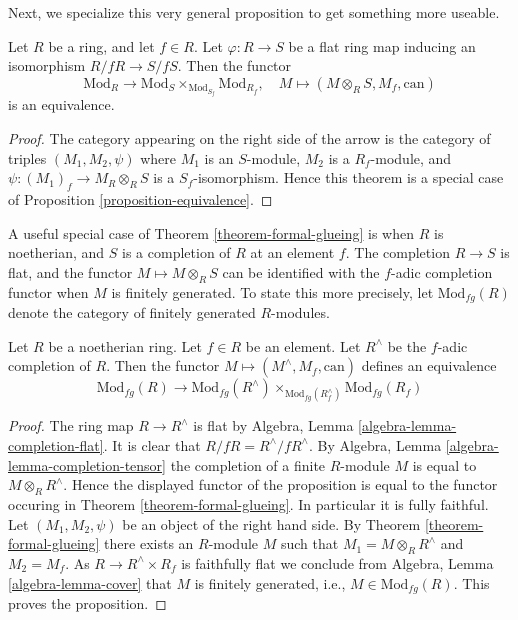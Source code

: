 \noindent
Next, we specialize this very general proposition to get something
more useable.

\begin{theorem}
\label{theorem-formal-glueing}
Let $R$ be a ring, and let $f \in R$.
Let $\varphi : R \to S$ be a flat ring map inducing an isomorphism
$R/fR \to S/fS$. Then the functor
$$
\text{Mod}_R
\longrightarrow
\text{Mod}_S \times_{\text{Mod}_{S_f}} \text{Mod}_{R_f},
\quad
M
\longmapsto
(M \otimes_R S, M_f, \text{can})
$$
is an equivalence.
\end{theorem}

\begin{proof}
The category appearing on the right side of the arrow
is the category of triples $(M_1, M_2, \psi)$ where $M_1$ is an
$S$-module, $M_2$ is a $R_f$-module, and
$\psi : (M_1)_f \to M_R \otimes_R S$ is a $S_f$-isomorphism.
Hence this theorem is a special case of
Proposition \ref{proposition-equivalence}.
\end{proof}

\noindent
A useful special case of
Theorem \ref{theorem-formal-glueing}
is when $R$ is noetherian, and $S$ is a completion of $R$ at an
element $f$. The completion $R \to S$ is flat, and the functor
$M \mapsto M \otimes_R S$ can be identified with the $f$-adic
completion functor when $M$ is finitely generated. To state
this more precisely, let $\text{Mod}_{fg}(R)$ denote the category
of finitely generated $R$-modules.

\begin{proposition}
\label{proposition-formal-glueing}
Let $R$ be a noetherian ring.
Let $f \in R$ be an element.
Let $R^\wedge$ be the $f$-adic completion of $R$.
Then the functor $M \mapsto (M^\wedge, M_f, \text{can})$
defines an equivalence
$$
\text{Mod}_{fg}(R)
\longrightarrow
\text{Mod}_{fg}(R^\wedge)
\times_{\text{Mod}_{fg}(R^\wedge_f)} 
\text{Mod}_{fg}(R_f)
$$
\end{proposition}

\begin{proof}
The ring map $R \to R^\wedge$ is flat by
Algebra, Lemma \ref{algebra-lemma-completion-flat}.
It is clear that $R/fR = R^\wedge/fR^\wedge$.
By
Algebra, Lemma \ref{algebra-lemma-completion-tensor}
the completion of a finite $R$-module $M$ is equal to $M \otimes_R R^\wedge$.
Hence the displayed functor of the proposition is equal to the
functor occuring in
Theorem \ref{theorem-formal-glueing}.
In particular it is fully faithful. Let $(M_1, M_2, \psi)$ be an
object of the right hand side. By
Theorem \ref{theorem-formal-glueing}
there exists an $R$-module $M$ such that
$M_1 = M \otimes_R R^\wedge$ and $M_2 = M_f$. As $R \to R^\wedge \times R_f$
is faithfully flat we conclude from
Algebra, Lemma \ref{algebra-lemma-cover}
that $M$ is finitely generated, i.e., $M \in \text{Mod}_{fg}(R)$.
This proves the proposition.
\end{proof}

